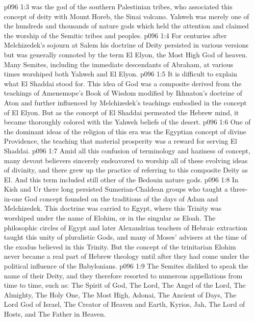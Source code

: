 \vs p096 1:3 \bibnobreakspace {} was the god of the southern Palestinian tribes, who associated this concept of deity with Mount Horeb, the Sinai volcano. Yahweh was merely one of the hundreds and thousands of nature gods which held the attention and claimed the worship of the Semitic tribes and peoples.
\vs p096 1:4 \pc {}\bibnobreakspace {} For centuries after Melchizedek’s sojourn at Salem his doctrine of Deity persisted in various versions but was generally connoted by the term El Elyon, the Most High God of heaven. Many Semites, including the immediate descendants of Abraham, at various times worshiped both Yahweh and El Elyon.
\vs p096 1:5 \pc {}\bibnobreakspace {} It is difficult to explain what El Shaddai stood for. This idea of God was a composite derived from the teachings of Amenemope’s Book of Wisdom modified by Ikhnaton’s doctrine of Aton and further influenced by Melchizedek’s teachings embodied in the concept of El Elyon. But as the concept of El Shaddai permeated the Hebrew mind, it became thoroughly colored with the Yahweh beliefs of the desert.
\vs p096 1:6 One of the dominant ideas of the religion of this era was the Egyptian concept of divine Providence, the teaching that material prosperity was a reward for serving El Shaddai.
\vs p096 1:7 \pc {}\bibnobreakspace {} Amid all this confusion of terminology and haziness of concept, many devout believers sincerely endeavored to worship all of these evolving ideas of divinity, and there grew up the practice of referring to this composite Deity as El. And this term included still other of the Bedouin nature gods.
\vs p096 1:8 \pc {}\bibnobreakspace {} In Kish and Ur there long persisted Sumerian\hyp{}Chaldean groups who taught a three\hyp{}in\hyp{}one God concept founded on the traditions of the days of Adam and Melchizedek. This doctrine was carried to Egypt, where this Trinity was worshiped under the name of Elohim, or in the singular as Eloah. The philosophic circles of Egypt and later Alexandrian teachers of Hebraic extraction taught this unity of pluralistic Gods, and many of Moses’ advisers at the time of the exodus believed in this Trinity. But the concept of the trinitarian Elohim never became a real part of Hebrew theology until after they had come under the political influence of the Babylonians.
\vs p096 1:9 \pc {}\bibnobreakspace {} The Semites disliked to speak the name of their Deity, and they therefore resorted to numerous appellations from time to time, such as: The Spirit of God, The Lord, The Angel of the Lord, The Almighty, The Holy One, The Most High, Adonai, The Ancient of Days, The Lord God of Israel, The Creator of Heaven and Earth, Kyrios, Jah, The Lord of Hosts, and The Father in Heaven.
